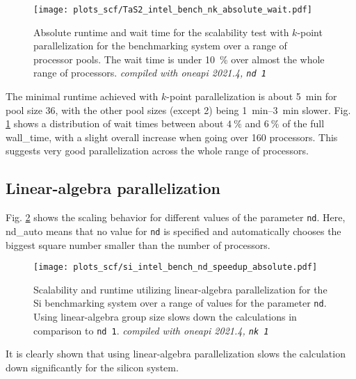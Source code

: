 \documentclass[main.tex]{subfiles}
\begin{document}
\begin{figure}[b!]
    \centering
    \texttt{[image: plots\_scf/TaS2\_intel\_bench\_nk\_absolute\_wait.pdf]}
    \caption{Absolute runtime and wait time for the scalability test with \(k\)-point parallelization for the \TaS benchmarking system over a range of processor pools. The wait time is under \SI{10}{\percent} over almost the whole range of processors. \emph{\QE compiled with \gls{oneapi} 2021.4, \texttt{nd 1}}}
    \label{fig:scaling_scf_nk_tas2_absolute_wait}
\end{figure}
The minimal runtime achieved with \(k\)-point parallelization is about \SI{5}{\minute} for pool size 36, with the other pool sizes (except 2) being \SIrange{1}{3}{\minute} slower.
Fig. \ref{fig:scaling_scf_nk_tas2_absolute_wait} shows a distribution of wait times between about \(\SI{4}{\percent}\) and \(\SI{6}{\percent}\) of the full \gls{wall_time}, with a slight overall increase when going over 160 processors.
This suggests very good parallelization across the whole range of processors.


\subsection{Linear-algebra parallelization}

Fig. \ref{fig:scaling_scf_nd_si} shows the scaling behavior for different values of the parameter \texttt{nd}.
Here, nd\_auto means that no value for \texttt{nd} is specified and \QE automatically chooses the biggest square number smaller than the number of processors.
\begin{figure}
    \centering
    \texttt{[image: plots\_scf/si\_intel\_bench\_nd\_speedup\_absolute.pdf]}
\caption{Scalability and runtime utilizing linear-algebra parallelization for the Si benchmarking system over a range of values for the parameter \texttt{nd}. Using linear-algebra group size slows down the calculations in comparison to \texttt{nd 1}. \emph{\QE compiled with \gls{oneapi} 2021.4, \texttt{nk 1}}}
\label{fig:scaling_scf_nd_si}
\end{figure}
It is clearly shown that using linear-algebra parallelization slows the calculation down significantly for the silicon system.
\end{document}
